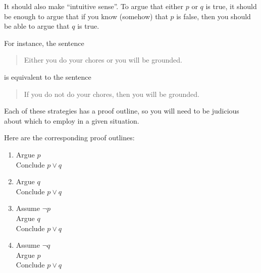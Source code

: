 It should also make ``intuitive sense''.  To argue that either $p$ or $q$ is true, it should be enough to argue that if you know (somehow) that $p$ is false, then you should be able to argue that $q$ is true.

For instance, the sentence 

\begin{quote}
		Either you do your chores or you will be grounded.
	\end{quote}

is equivalent to the sentence

\begin{quote}
		If you do not do your chores, then you will be grounded.
	\end{quote}

Each of these strategies has a proof outline, so you will need to be judicious about which to employ in a given situation.

Here are the corresponding proof outlines:

\begin{enumerate}
		\item
	
	\begin{fitch*}
		\textrm{Argue $p$}\\
		\textrm{Conclude $p \vee q$}
	\end{fitch*}
		\item
	
	\begin{fitch*}
		\textrm{Argue  $q$}\\
		\textrm{Conclude $p \vee q$}
	\end{fitch*}
	\item
	
\begin{fitch*}
	\textrm{Assume $\neg p$}\\
	\fa \textrm{Argue $q$}\\
	\textrm{Conclude $p \vee q$}
	\end{fitch*}

	\item

\begin{fitch*}
	\textrm{Assume $\neg q$}\\
	\fa \textrm{Argue $p$}\\
	\textrm{Conclude $p \vee q$}
\end{fitch*}
\end{enumerate}

\newpage

